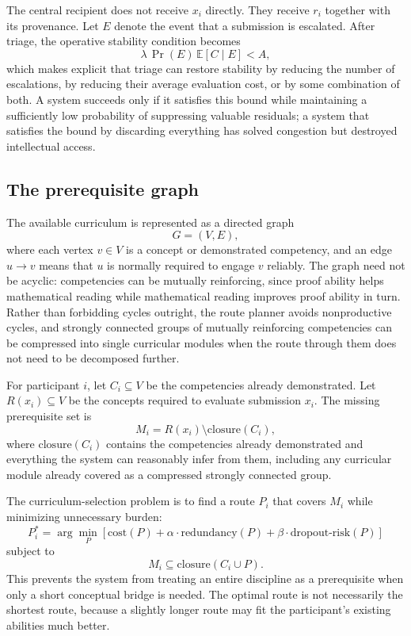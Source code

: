 \documentclass[11pt]{article}
\begin{document}
The central recipient does not receive $x_i$ directly. They receive $r_i$ together with its provenance. Let $E$ denote the event that a submission is escalated. After triage, the operative stability condition becomes
\[
\lambda\,\Pr(E)\,\mathbb{E}[C \mid E] < A,
\]
which makes explicit that triage can restore stability by reducing the number of escalations, by reducing their average evaluation cost, or by some combination of both. A system succeeds only if it satisfies this bound while maintaining a sufficiently low probability of suppressing valuable residuals; a system that satisfies the bound by discarding everything has solved congestion but destroyed intellectual access.

\subsection{The prerequisite graph}

The available curriculum is represented as a directed graph
\[
G = (V, E),
\]
where each vertex $v \in V$ is a concept or demonstrated competency, and an edge $u \to v$ means that $u$ is normally required to engage $v$ reliably. The graph need not be acyclic: competencies can be mutually reinforcing, since proof ability helps mathematical reading while mathematical reading improves proof ability in turn. Rather than forbidding cycles outright, the route planner avoids nonproductive cycles, and strongly connected groups of mutually reinforcing competencies can be compressed into single curricular modules when the route through them does not need to be decomposed further.

For participant $i$, let $C_i \subseteq V$ be the competencies already demonstrated. Let $R(x_i) \subseteq V$ be the concepts required to evaluate submission $x_i$. The missing prerequisite set is
\[
M_i = R(x_i) \setminus \mathrm{closure}(C_i),
\]
where $\mathrm{closure}(C_i)$ contains the competencies already demonstrated and everything the system can reasonably infer from them, including any curricular module already covered as a compressed strongly connected group.

The curriculum-selection problem is to find a route $P_i$ that covers $M_i$ while minimizing unnecessary burden:
\[
P_i^{*} = \arg\min_{P} \left[ \mathrm{cost}(P) + \alpha \cdot \mathrm{redundancy}(P) + \beta \cdot \mathrm{dropout\text{-}risk}(P) \right]
\]
subject to
\[
M_i \subseteq \mathrm{closure}(C_i \cup P).
\]
This prevents the system from treating an entire discipline as a prerequisite when only a short conceptual bridge is needed. The optimal route is not necessarily the shortest route, because a slightly longer route may fit the participant's existing abilities much better.
\end{document}
